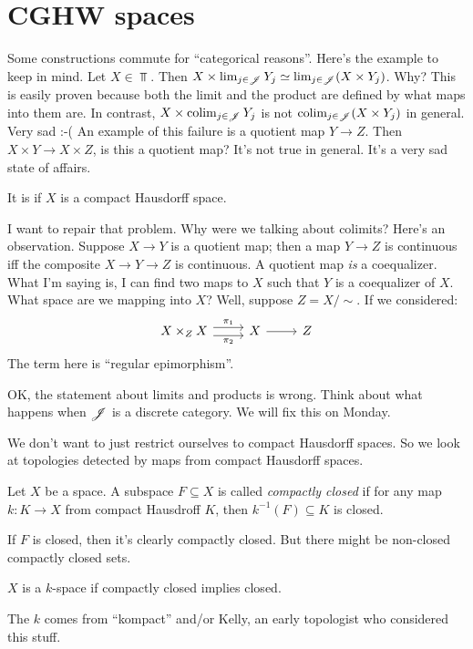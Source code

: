 \section{CGHW spaces}
Some constructions commute for ``categorical reasons''. Here's the example to keep in mind. Let $X\in \Top$. Then $X\times\lim_{j\in\mathscr J}Y_j\simeq \lim_{j\in\mathscr J}(X\times Y_j)$. Why? This is easily proven because both the limit and the product are defined by what maps into them are. In contrast, $X\times\operatorname{colim}_{j\in \mathscr J}Y_j$ is not $\operatorname{colim}_{j\in \mathscr J}(X\times Y_j)$ in general. Very sad :-( An example of this failure is a quotient map $Y\to Z$. Then $X\times Y\to X\times Z$, is this a quotient map? It's not true in general. It's a very sad state of affairs.
\begin{theorem}[Whitehead]
    It is if $X$ is a compact Hausdorff space.
\end{theorem}
I want to repair that problem. Why were we talking about colimits? Here's an observation. Suppose $X\to Y$ is a quotient map; then a map $Y\to Z$ is continuous iff the composite $X\to Y\to Z$ is continuous. A quotient map \emph{is} a coequalizer. What I'm saying is, I can find two maps to $X$ such that $Y$ is a coequalizer of $X$. What space are we mapping into $X$? Well, suppose $Z=X/\sim$. If we considered:
\begin{equation*}
    \begin{tikzcd}
	X\times_Z X\ar[r,shift left=.75ex,"\pi_1"]\ar[r,shift right=.75ex,swap,"\pi_2"] & X\ar[r] & Z
    \end{tikzcd}
\end{equation*}
The term here is ``regular epimorphism''.

\begin{remark}
    OK, the statement about limits and products is wrong. Think about what happens when $\mathscr J$ is a discrete category. We will fix this on Monday.
\end{remark}

We don't want to just restrict ourselves to compact Hausdorff spaces. So we look at topologies detected by maps from compact Hausdorff spaces.
\begin{definition}
    Let $X$ be a space. A subspace $F\subseteq X$ is called \emph{compactly closed} if for any map $k:K\to X$ from compact Hausdroff $K$, then $k^{-1}(F)\subseteq K$ is closed.
\end{definition}
If $F$ is closed, then it's clearly compactly closed. But there might be non-closed compactly closed sets.
\begin{definition}
    $X$ is a $k$-space if compactly closed implies closed.
\end{definition}
The $k$ comes from ``kompact'' and/or Kelly, an early topologist who considered this stuff.


